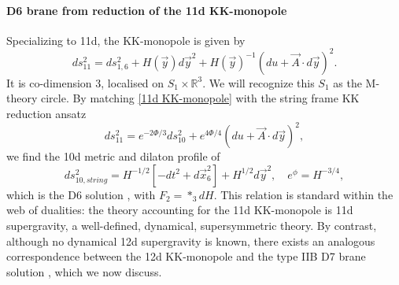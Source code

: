\paragraph{D6 brane from reduction of the 11d KK-monopole}
Specializing to 11d, the KK-monopole is given by
\begin{equation}
ds_{11}^2=ds_{1,6}^2 + H(\vec{y})d\vec{y}^2+H(\vec{y})^{-1}(du+\vec{A}\cdot d\vec{y})^2.
\label{11d KK-monopole}
\end{equation}
It is co-dimension 3, localised on $S_1\times\mathbb{R}^3$. 
We will recognize this $S_1$ as the M-theory circle.
By matching \eqref{11d KK-monopole} with the string frame KK reduction ansatz
\begin{equation}
ds_{11}^2=e^{-2\Phi/3}ds_{10}^2+e^{4\Phi/4}(du+ \vec{A}\cdot d\vec{y})^2,
\label{string frame KK reduction ansatz}
\end{equation}
we find the 10d metric and dilaton profile of
\begin{equation}
ds_{10,string}^2=H^{-1/2}[-dt^2+d\vec{x}_6^2] + H^{1/2}d\vec{y}^2,\quad
e^\phi=H^{-3/4},
\end{equation}
which is the D6 solution \cite{Horowitz:1991cd,Townsend:1995kk}, with $F_2=*_3 dH$.
This relation is standard within the web of dualities: the theory accounting for the 11d KK-monopole is 11d supergravity, a well-defined, dynamical, supersymmetric theory.
By contrast, although no dynamical 12d supergravity is known, there exists an analogous correspondence between the 12d KK-monopole and the type IIB D7 brane solution \cite{Tseytlin:1996ne}, which we now discuss.

